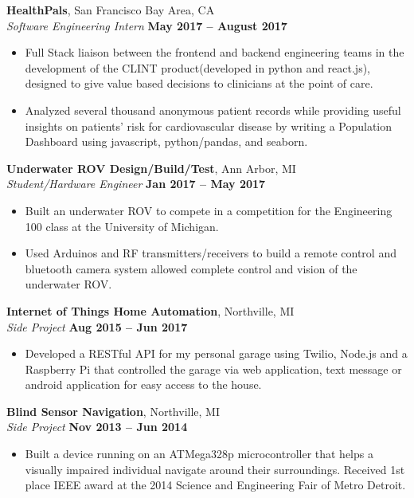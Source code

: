 \documentclass[margin,line]{resume}
\begin{document}
\begin{resume}
	\textbf{HealthPals}, San Francisco Bay Area, CA \vspace{2mm}\\\vspace{1mm}%
	\textsl{Software Engineering Intern} \hfill \textbf{May 2017 -- August 2017}
	\begin{itemize}
		\item Full Stack liaison between the frontend and backend engineering teams in the development of the CLINT product(developed in python and react.js), designed to give value based decisions to clinicians at the point of care.
		\item Analyzed several thousand anonymous patient records while providing useful insights on patients' risk for cardiovascular disease by writing a Population Dashboard using javascript, python/pandas, and seaborn.
	\end{itemize}




\textbf{Underwater ROV Design/Build/Test}, Ann Arbor, MI \vspace{2mm}\\\vspace{1mm}%
\textsl{Student/Hardware Engineer} \hfill \textbf{Jan 2017 -- May 2017}
\begin{itemize}
	\item Built an underwater ROV to compete in a competition for the Engineering 100 class at the University of Michigan.
	\item Used Arduinos and RF transmitters/receivers to build a remote control and bluetooth camera system allowed complete control and vision of the underwater ROV.
	
\end{itemize}

	\textbf{Internet of Things Home Automation}, Northville, MI \vspace{2mm}\\\vspace{1mm}%
	\textsl{Side Project} \hfill \textbf{Aug 2015 -- Jun 2017}
	\begin{itemize}
		\item Developed a RESTful API for my personal garage using Twilio, Node.js and a Raspberry Pi that controlled the garage via web application, text message or android application for easy access to the house.
	\end{itemize}
	
    \textbf{Blind Sensor Navigation}, Northville, MI \vspace{2mm}\\\vspace{1mm}%
	\textsl{Side Project} \hfill \textbf{Nov 2013 -- Jun 2014}
	\begin{itemize}
		\item Built a device running on an ATMega328p micro­controller that helps a visually impaired individual navigate around their surroundings. Received 1st place IEEE award at the 2014 Science and Engineering Fair of Metro Detroit. 
	\end{itemize}


\end{resume}
\end{document}
